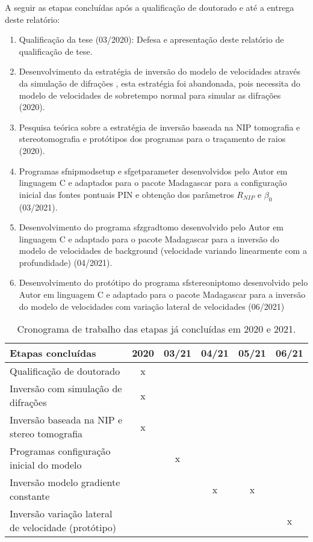 A seguir as etapas concluídas após a qualificação de doutorado e até a entrega deste relatório:
  
  \begin{enumerate}
  \item Qualificação da tese (03/2020): Defesa e apresentação deste relatório de qualificação de tese.
  \item Desenvolvimento da estratégia de inversão do modelo de velocidades através da simulação
  de difrações \cite{diffractions}, esta estratégia foi abandonada, pois necessita do
  modelo de velocidades de sobretempo normal para simular as difrações (2020).
  \item Pesquisa teórica sobre a estratégia de inversão baseada na NIP tomografia \cite{niptomo}
  e stereotomografia \cite{stereo} e protótipos dos programas para o traçamento de raios (2020).
   \item Programas sfnipmodsetup e sfgetparameter desenvolvidos pelo Autor em linguagem C 
     e adaptados para o pacote Madagascar para a configuração inicial das fontes pontuais PIN
    e obtenção dos parâmetros $R_{NIP}$ e $\beta_0$ (03/2021).
   \item Desenvolvimento do programa sfzgradtomo desenvolvido pelo Autor em linguagem C 
    e adaptado para o pacote Madagascar para a inversão do modelo de velocidades de background
    (velocidade variando linearmente com a profundidade) (04/2021).
   \item Desenvolvimento do protótipo do programa sfstereoniptomo desenvolvido pelo Autor em linguagem C 
     e adaptado para o pacote Madagascar para a inversão do modelo de velocidades com variação
     lateral de velocidades (06/2021)
  \end{enumerate}


  \begin{table}[H]
      \caption{Cronograma de trabalho das etapas já concluídas em 2020 e 2021.}
      \centering
      
      \begin{tabular}{|p{6cm}|c|c|c|c|c|}%

     \hline
      \textbf{Etapas concluídas} & 2020 & 03/21 & 04/21 & 05/21 & 06/21 \\ \hline
      Qualificação de doutorado & x & & &  & \\ \hline
      Inversão com simulação de difrações & x & & &  & \\ \hline
      Inversão baseada na NIP e stereo tomografia & x & & &  & \\ \hline
      Programas configuração inicial do modelo & & x & &  & \\ \hline
      Inversão modelo gradiente constante & & & x & x & \\ \hline
      Inversão variação lateral de velocidade (protótipo) & & & & & x \\
      \hline
      \end{tabular}
  \end{table}
  

